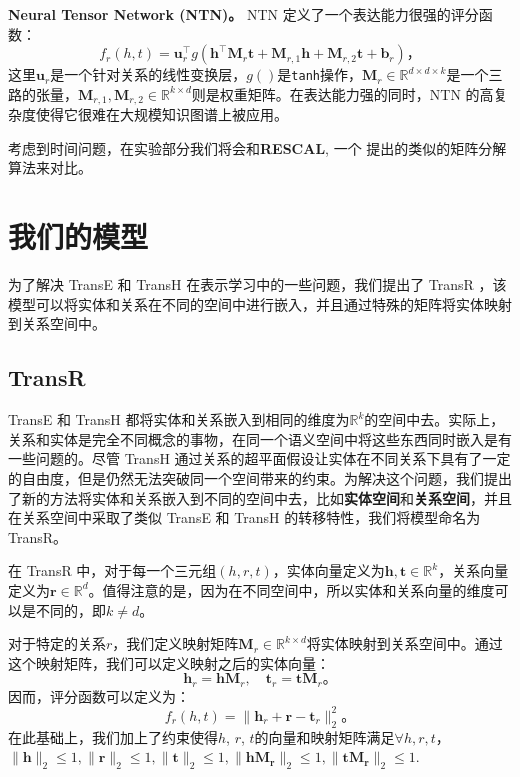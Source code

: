     \textbf{Neural Tensor Network (NTN)。} NTN \cite{socher2013reasoning} 定义了一个表达能力很强的评分函数：
    \begin{equation}
    f_{r}(h, t) = \mathbf{u}_r^\top g (\mathbf{h}^{\top} \mathbf{M}_r \mathbf{t} + \mathbf{M}_{r, 1} \mathbf{h} + \mathbf{M}_{r, 2}\mathbf{t} + \mathbf{b}_r)，
    \end{equation}
    这里$\mathbf{u}_r$是一个针对关系的线性变换层，$g()$是\texttt{tanh}操作，$\mathbf{M}_r \in \mathbb{R}^{d \times d \times k}$是一个三路的张量，$\mathbf{M}_{r, 1}, \mathbf{M}_{r, 2} \in  \mathbb{R}^{k\times d}$则是权重矩阵。在表达能力强的同时，NTN 的高复杂度使得它很难在大规模知识图谱上被应用。

    考虑到时间问题，在实验部分我们将会和\textbf{RESCAL}, 一个 \cite{nickel2011three,nickel2012factorizing} 提出的类似的矩阵分解算法来对比。


    \section{我们的模型}
    \label{sec:method}

    为了解决 TransE 和 TransH 在表示学习中的一些问题，我们提出了 TransR ，该模型可以将实体和关系在不同的空间中进行嵌入，并且通过特殊的矩阵将实体映射到关系空间中。

    \subsection{TransR}


    TransE 和 TransH 都将实体和关系嵌入到相同的维度为$\mathbb{R}^k$的空间中去。实际上，关系和实体是完全不同概念的事物，在同一个语义空间中将这些东西同时嵌入是有一些问题的。尽管 TransH 通过关系的超平面假设让实体在不同关系下具有了一定的自由度，但是仍然无法突破同一个空间带来的约束。为解决这个问题，我们提出了新的方法将实体和关系嵌入到不同的空间中去，比如\textbf{实体空间}和\textbf{关系空间}，并且在关系空间中采取了类似 TransE 和 TransH 的转移特性，我们将模型命名为TransR。

    在 TransR 中，对于每一个三元组$(h, r, t)$，实体向量定义为$\mathbf{h}, \mathbf{t} \in \mathbb{R}^k$，关系向量定义为$\mathbf{r} \in \mathbb{R}^d$。值得注意的是，因为在不同空间中，所以实体和关系向量的维度可以是不同的，即$k \ne d$。

    对于特定的关系$r$，我们定义映射矩阵$\mathbf{M}_{r} \in \mathbb{R}^{k \times d}$将实体映射到关系空间中。通过这个映射矩阵，我们可以定义映射之后的实体向量：
    \begin{equation}
    \mathbf{h}_{r} = \mathbf{h}\mathbf{M}_r, \quad \mathbf{t}_{r} = \mathbf{t}\mathbf{M}_r。
    \end{equation}
    因而，评分函数可以定义为：
    \begin{equation}
    f_{r}(h, t) = \|\mathbf{h}_r + \mathbf{r} - \mathbf{t}_r\|_{2}^{2}。
    \end{equation}
    在此基础上，我们加上了约束使得$h$, $r$, $t$的向量和映射矩阵满足$\forall h, r, t$，$\|\mathbf{h}\|_2\le1,\|\mathbf{r}\|_2\le1, \|\mathbf{t}\|_2\le1, \|\mathbf{h}\mathbf{M_r}\|_2\le1, \|\mathbf{t}\mathbf{M_r}\|_2\le1$.

